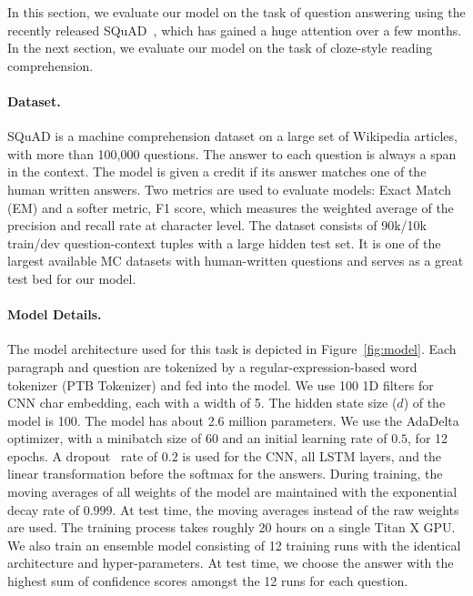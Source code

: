 In this section, we evaluate our model on the task of question answering using the recently released SQuAD~\citep{rajpurkar2016squad}, which has gained a huge attention over a few months. In the next section, we evaluate our model on the task of cloze-style reading comprehension. 


\paragraph{Dataset.}
SQuAD is a machine comprehension dataset on a large set of Wikipedia articles, with more than 100,000 questions. The answer to each question is always a span in the context. 
The model is given a credit if its answer matches one of the human written answers.  
Two metrics are used to evaluate models: Exact Match (EM) and a softer metric, F1 score, which measures the weighted average of the precision and recall rate at character level. 
The dataset consists of 90k/10k train/dev question-context tuples with a large hidden test set. 
It is one of the largest available MC datasets with human-written questions and serves as a great test bed for our model.

\paragraph{Model Details.}\label{subsec:squad-details}
The model architecture used for this task is depicted in Figure~\ref{fig:model}. Each paragraph and question are tokenized by a regular-expression-based word tokenizer (PTB Tokenizer) and fed into the model. We use 100 1D filters for CNN char embedding, each with a width of 5. 
The hidden state size ($d$) of the model is 100. 
The model has about 2.6 million parameters.
We use the AdaDelta~\citep{adadelta} optimizer, with a minibatch size of 60 and an initial learning rate of $0.5$, for 12 epochs. 
A dropout~\citep{dropout} rate of $0.2$ is used for the CNN, all LSTM layers, and the linear transformation before the softmax for the answers. 
During training, the moving averages of all weights of the model are maintained with the exponential decay rate of $0.999$. 
At test time, the moving averages instead of the raw weights are used.
The training process takes roughly 20 hours on a single Titan X GPU. We also train an ensemble model consisting of 12 training runs with the identical architecture and hyper-parameters. 
At test time, we choose the answer with the highest sum of confidence scores amongst the 12 runs for each question.

